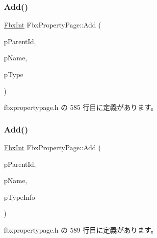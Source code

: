 \subsubsection{\texorpdfstring{Add()}{Add()}\hspace{0.1cm}{\footnotesize\ttfamily [1/2]}}
{\footnotesize\ttfamily \hyperlink{fbxtypes_8h_a088fa96de3b0b3ea69f0f6afef525dfb}{Fbx\+Int} Fbx\+Property\+Page\+::\+Add (\begin{DoxyParamCaption}\item[{\hyperlink{fbxtypes_8h_a088fa96de3b0b3ea69f0f6afef525dfb}{Fbx\+Int}}]{p\+Parent\+Id,  }\item[{const char $\ast$}]{p\+Name,  }\item[{\hyperlink{fbxpropertytypes_8h_a73913a5ddfb20e57c6f25e9e6784bd92}{E\+Fbx\+Type}}]{p\+Type }\end{DoxyParamCaption})\hspace{0.3cm}{\ttfamily [inline]}}



 fbxpropertypage.\+h の 585 行目に定義があります。

\mbox{\label{class_fbx_property_page_a96c5b9945595bc33ff1027211e2e2ffb}} 
\subsubsection{\texorpdfstring{Add()}{Add()}\hspace{0.1cm}{\footnotesize\ttfamily [2/2]}}
{\footnotesize\ttfamily \hyperlink{fbxtypes_8h_a088fa96de3b0b3ea69f0f6afef525dfb}{Fbx\+Int} Fbx\+Property\+Page\+::\+Add (\begin{DoxyParamCaption}\item[{\hyperlink{fbxtypes_8h_a088fa96de3b0b3ea69f0f6afef525dfb}{Fbx\+Int}}]{p\+Parent\+Id,  }\item[{const char $\ast$}]{p\+Name,  }\item[{\hyperlink{class_fbx_property_page}{Fbx\+Property\+Page} $\ast$}]{p\+Type\+Info }\end{DoxyParamCaption})\hspace{0.3cm}{\ttfamily [inline]}}



 fbxpropertypage.\+h の 589 行目に定義があります。

\mbox{\label{class_fbx_property_page_a966b4958ccd7d932772c719b30221d67}} 

